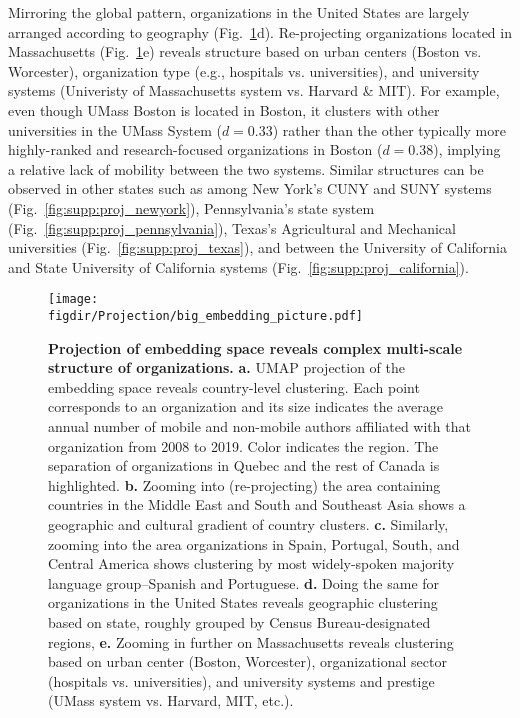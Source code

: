 \documentclass[12pt]{article} %
\def\figdir{../Figs}
\begin{document}
Mirroring the global pattern, organizations in the United States are largely arranged according to geography (Fig.~\ref{fig:projection}d).
Re-projecting organizations located in Massachusetts (Fig.~\ref{fig:projection}e) reveals structure based on urban centers (Boston vs. Worcester), organization type (e.g., hospitals vs. universities), and university systems (Univeristy of  Massachusetts system vs. Harvard \& MIT).
For example, even though UMass Boston is located in Boston, it clusters with other universities in the UMass System ($d = 0.33$) rather than the other typically more highly-ranked and research-focused organizations in Boston ($d = 0.38$), implying a relative lack of mobility between the two systems.
Similar structures can be observed in other states such as among New York's CUNY and SUNY systems (Fig.~\ref{fig:supp:proj_newyork}), Pennsylvania's state system (Fig.~\ref{fig:supp:proj_pennsylvania}), Texas's Agricultural and Mechanical universities (Fig.~\ref{fig:supp:proj_texas}), and between the University of California and State University of California systems (Fig.~\ref{fig:supp:proj_california}).

%
%
\begin{figure}[hp!]
	\centering
	\texttt{[image: \\figdir/Projection/big\_embedding\_picture.pdf]}
	\caption{
		\textbf{Projection of embedding space reveals complex multi-scale structure of organizations.}
		\textbf{a.}
		UMAP projection \autocite{mcinnes2018umap} of the embedding space reveals country-level clustering.
		Each point corresponds to an organization and its size indicates the average annual number of mobile and non-mobile authors affiliated with that organization from 2008 to 2019.
		Color indicates the region.
		The separation of organizations in Quebec and the rest of Canada is highlighted. 
		\textbf{b.} Zooming into (re-projecting) the area containing countries in the Middle East and South and Southeast Asia shows a geographic and cultural gradient of country clusters.
		\textbf{c.} Similarly, zooming into the area organizations in Spain, Portugal, South, and Central America shows clustering by most widely-spoken majority language group--Spanish and Portuguese.
		\textbf{d.} Doing the same for organizations in the United States reveals geographic clustering based on state, roughly grouped by Census Bureau-designated regions,
		\textbf{e.} Zooming in further on Massachusetts reveals clustering based on urban center (Boston, Worcester), organizational sector (hospitals vs. universities), and university systems and prestige (UMass system vs. Harvard, MIT, etc.).
	}
	\label{fig:projection}
\end{figure}
\end{document}
